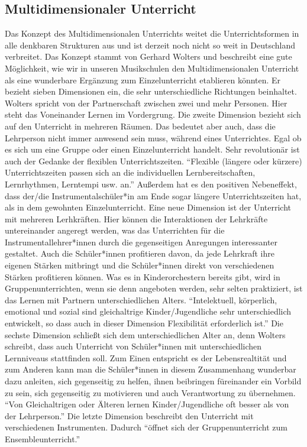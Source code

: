 \subsection{Multidimensionaler Unterricht} 
Das Konzept des Multidimensionalen Unterrichts weitet die Unterrichtsformen in
alle denkbaren Strukturen aus und ist derzeit noch nicht so weit in Deutschland
verbreitet. Das Konzept stammt von Gerhard Wolters und beschreibt eine gute
Möglichkeit, wie wir in unseren Musikschulen den Multidimensionalen Unterricht
als eine wunderbare Ergänzung zum Einzelunterricht etablieren könnten. Er
bezieht sieben Dimensionen ein, die sehr unterschiedliche Richtungen beinhaltet.
\autocite[86ff]{ernst:die_zukunftsfaehige_musikschule} Wolters spricht von der
Partnerschaft zwischen zwei und mehr Personen. Hier steht das Voneinander Lernen
im Vordergrung. Die zweite Dimension bezieht sich auf den Unterricht in mehreren
Räumen. Das bedeutet aber auch, dass die Lehrperson nicht immer anwesend sein
muss, während eines Unterrichtes. Egal ob es sich um eine Gruppe oder einen
Einzelunterricht handelt. Sehr revolutionär ist auch der Gedanke der flexiblen
Unterrichtszeiten. \enquote{Flexible (längere oder kürzere) Unterrichtszeiten
passen sich an die individuellen Lernbereitschaften, Lernrhythmen, Lerntempi
usw. an.} \autocite[87]{ernst:die_zukunftsfaehige_musikschule} Außerdem hat es
den positiven Nebeneffekt, dass der/die Instrumentalschüler*in am Ende sogar
längere Unterrichtszeiten hat, als in dem gewohnten Einzelunterricht. Eine neue Dimension ist
der Unterricht mit mehreren Lerhkräften. Hier können die Interaktionen der
Lehrkräfte untereinander angeregt werden, was das Unterrichten für die
Instrumentallehrer*innen durch die gegenseitigen Anregungen interessanter
gestaltet. Auch die Schüler*innen profitieren davon, da jede Lehrkraft ihre
eigenen Stärken mitbringt und die Schüler*innen direkt von verschiedenen Stärken
profitieren können. Was es in Kinderorchestern bereits gibt, wird in
Gruppenunterrichten, wenn sie denn angeboten werden, sehr selten praktiziert,
ist das Lernen mit Partnern unterschiedlichen Alters. \enquote{Intelektuell,
körperlich, emotional und sozial sind gleichaltrige Kinder/Jugendliche sehr
unterschiedlich entwickelt, so dass auch in dieser Dimension Flexibilität
erforderlich ist.} \autocite[87]{ernst:die_zukunftsfaehige_musikschule} Die
sechste Dimension schließt sich dem unterschiedlichen Alter an, denn Wolters
schreibt, dass auch Unterricht von Schüler*innen mit unterschiedlichen
Lernniveaus stattfinden soll. Zum Einen entspricht es der Lebensrealtität und
zum Anderen kann man die Schüler*innen in diesem Zusammenhang wunderbar dazu
anleiten, sich gegenseitig zu helfen, ihnen beibringen füreinander ein Vorbild
zu sein, sich gegenseitig zu motivieren und auch Verantwortung zu übernehmen.
\enquote{Von Gleichaltrigen oder Älteren lernen Kinder/Jugendliche oft besser
als von der Lehrperson.} \autocite[87]{ernst:die_zukunftsfaehige_musikschule}
Die letzte Dimension beschreibt den Unterricht mit verschiedenen Instrumenten.
Dadurch
\enquote{öffnet sich der Gruppenunterricht zum Ensembleunterricht.}
\autocite[87]{ernst:die_zukunftsfaehige_musikschule}

